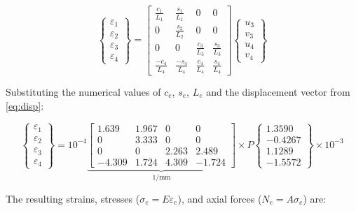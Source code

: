 \documentclass[11pt, a4paper]{article}
\begin{document}
\begin{equation}\label{eq:strain_matrix}
\begin{Bmatrix} \varepsilon_1 \\ \varepsilon_2 \\ \varepsilon_3 \\ \varepsilon_4 \end{Bmatrix}
=
\begin{bmatrix}
\frac{c_1}{L_1} & \frac{s_1}{L_1} & 0 & 0 \\[4pt]
0 & \frac{s_2}{L_2} & 0 & 0 \\[4pt]
0 & 0 & \frac{c_3}{L_3} & \frac{s_3}{L_3} \\[4pt]
\frac{-c_4}{L_4} & \frac{-s_4}{L_4} & \frac{c_4}{L_4} & \frac{s_4}{L_4}
\end{bmatrix}
\begin{Bmatrix} u_3 \\ v_3 \\ u_4 \\ v_4 \end{Bmatrix}
\end{equation}

Substituting the numerical values of $c_e$, $s_e$, $L_e$ and the displacement vector from \cref{eq:disp}:

\begin{equation}\label{eq:strain_num}
\begin{Bmatrix} \varepsilon_1 \\ \varepsilon_2 \\ \varepsilon_3 \\ \varepsilon_4 \end{Bmatrix}
= 10^{-4}\!
\underbrace{\begin{bmatrix}
1.639 & 1.967 & 0 & 0 \\
0 & 3.333 & 0 & 0 \\
0 & 0 & 2.263 & 2.489 \\
-4.309 & 1.724 & 4.309 & -1.724
\end{bmatrix}}_{\text{1/mm}}
\times P\!
\begin{Bmatrix}
1.3590 \\ -0.4267 \\ 1.1289 \\ -1.5572
\end{Bmatrix}
\!\times\!10^{-3}
\end{equation}

\noindent The resulting strains, stresses ($\sigma_e=E\varepsilon_e$), and axial forces ($N_e=A\sigma_e$) are:
\end{document}
